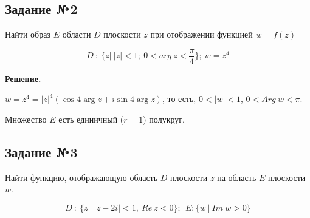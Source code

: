 \documentclass{article}
\begin{document}
\subsection{Задание №2}

Найти образ $E$ области $D$ плоскости $z$ при отображении функцией $w = f(z)$ 

$$
D \ : \ \{ z | \ |z| < 1; \ 0 < arg \ z < \frac{\pi}{4} \}; \ w = z^4
$$

\textbf{Решение.}

$w = z^4 = |z|^4 (\cos 4 \arg z + i \sin 4 \arg z)$, то есть, $0 < |w| < 1$, $0 < Arg \ w < \pi$.

Множество $E$ есть единичный ($r = 1$) полукруг.

\subsection{Задание №3}

Найти функцию, отображающую область $D$ плоскости $z$ на область $E$ плоскости $w$.

$$
D \ : \ \{ z \ | \ | z - 2 i | < 1, \ Re \ z < 0 \}; \ \ E: \{ w \ | \ Im \ w > 0 \}
$$
\end{document}
